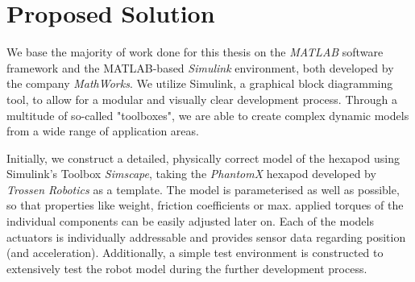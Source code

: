 
\section{Proposed Solution}


We base the majority of work done for this thesis on the \textit{MATLAB\textsuperscript{\textregistered}} software framework and the MATLAB-based \textit{Simulink\textsuperscript{\textregistered}} environment, both developed by the company \textit{MathWorks\textsuperscript{\textregistered}}.
We utilize Simulink, a graphical block diagramming tool, to allow for a modular and visually clear development process.
Through a multitude of so-called "toolboxes", we are able to create complex dynamic models from a wide range of application areas.

Initially, we construct a detailed, physically correct model of the hexapod using Simulink's Toolbox \textit{Simscape\textsuperscript{\texttrademark}}, taking the \emph{PhantomX} hexapod developed by \emph{Trossen Robotics} as a template.
The model is parameterised as well as possible, so that properties like weight, friction coefficients or max. applied torques of the individual components can be easily adjusted later on.
Each of the models actuators is individually addressable and provides sensor data regarding position (and acceleration).
Additionally, a simple test environment is constructed to extensively test the robot model during the further development process.

